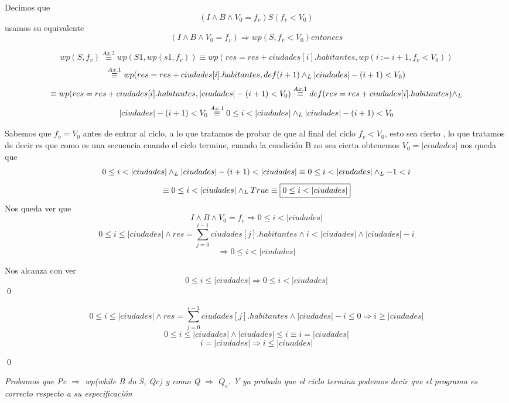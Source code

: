 \documentclass[10pt,a4paper]{article}
\begin{document}
\begin{demoPc}
\begin{demo3}
	
\end{demo3}




\begin{demo4}
	Decimos que
		\[
		 (I \land B \land V_{0}=f_{v}) S (f_{v}<V_{0})\]  usamos su equivalente \[(I \land B \land V_{0}=f_{v}) \Longrightarrow wp(S,f_{v}<V_{0}) entonces\]
		
		\[wp(S,f_{v}) \overset{Ax. 3}{\equiv} wp(S1,wp(s1,f_{v})) \equiv wp(res=res+ciudades[i].habitantes,wp(i:=i+1,f_{v} < V_{0})) \]
		\[\overset{Ax. 1}{\equiv} wp(res=res+ciudades[i].habitantes,def(i+1)\land _L |ciudades|-(i+1)<V_{0}) \]
		\[\equiv wp(res=res+ciudades[i].habitantes,|ciudades|-(i+1)<V_{0}) \overset{Ax. 1}{\equiv} def(res=res+ciudades[i].habitantes) \land _L\]
		\[|ciudades| -(i+1) < V_{0} \overset{Ax. 1}{\equiv} 0 \leq i<|ciudades| \yLuego |ciudades|-(i+1)<V_{0} \]
		
\noindent  Sabemos que $f_{v}=V_{0}$ antes de entrar al ciclo, a lo que tratamos de probar de que al final del ciclo $f_{v} < V_{0}$, esto sea cierto , 
lo que tratamos de decir es que como es una secuencia  cuando el ciclo termine, cuando la condición B no sea cierta obtenemos $V_{0} =|ciudades|$
		nos queda que
		\[0 \leq i <|ciudades| \yLuego |ciudades|-(i+1) < |ciudades| \equiv 0 \leq i <|ciudades| \yLuego -1<i \]
		\[\equiv 0 \leq i <|ciudades| \yLuego True \equiv \boxed{0 \leq i <|ciudades|}\]
	Nos queda ver que
		\[I \land B \land V_{0}=f_{v} \Longrightarrow 0 \leq i <|ciudades|\]
		\[ 0 \leq i \leq |ciudades| \land res= \sum_{j=0}^{i-1} ciudades[j].habitantes \land i < \lvert ciudades \rvert \land \lvert ciudades \rvert - i\]
		\[\Longrightarrow  0 \leq i < |ciudades|\]
		
	Nos alcanza con ver 
		\[ 0 \leq i \leq |ciudades| \Longrightarrow  0 \leq i < |ciudades|\]
		\qed

\end{demo4}





\begin{demo5}
	\[
	0 \leq i \leq \lvert ciudades\rvert \land res= \sum_{j=0}^{i-1} ciudades[j].habitantes \land |ciudades| -i\leq 0 \Longrightarrow i \geq |ciudades|
	\]
	\[
	0 \leq i \leq |ciudades| \land |ciudades| \leq i \equiv i =|ciudades| 
	\]
	\[i=|ciudades| \Longrightarrow i \leq |ciuaddes|\]
	

	\qed \\
	
\end{demo5}
\noindent \textit{\emph{Probamos que Pc $\Longrightarrow$ wp(while B do S, Qc)
  y como Q $\Longrightarrow$ $Q_{c}$. 
   Y ya probado que el ciclo termina podemos decir que el programa es correcto respecto a su especificación} }

\end{demoPc}
\end{document}
